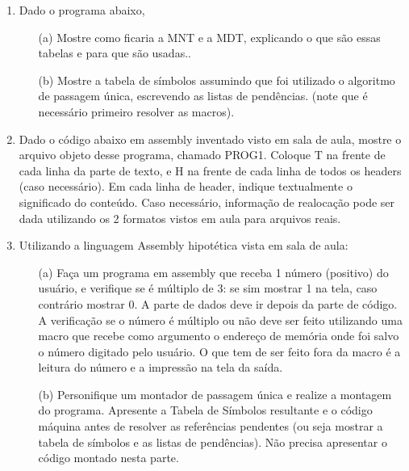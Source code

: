 \begin{enumerate}[resume]

    \item
    Dado o programa abaixo,    

    \begin{itemize}
        \item [(a)]
        Mostre como ficaria a MNT e a MDT, 
        explicando o que são essas tabelas e para que são usadas..

        \item [(b)]
        Mostre a tabela de símbolos assumindo que foi utilizado
        o algoritmo de passagem única, escrevendo as listas de pendências.
        (note que é necessário primeiro resolver as macros).
    \end{itemize}    

    \item
    Dado o código abaixo em assembly inventado visto em sala de aula,
    mostre o arquivo objeto desse programa, chamado PROG1.
    Coloque T na frente de cada linha da parte de texto,
    e H na frente de cada linha de todos os headers (caso necessário).
    Em cada linha de header, indique textualmente o significado do conteúdo.
    Caso necessário, informação de realocação pode ser dada 
    utilizando os 2 formatos vistos em aula para arquivos reais.
    
    \item
    Utilizando a linguagem Assembly hipotética vista em sala de aula:
    \begin{itemize}
        \item [(a)]
        Faça um programa em assembly que receba 1 número (positivo) do usuário, 
        e verifique se é múltiplo de 3:
        se sim mostrar 1 na tela, caso contrário mostrar 0. 
        A parte de dados deve ir depois da parte de código.
        A verificação se o número é múltiplo ou não 
        deve ser feito utilizando uma macro que recebe como argumento 
        o endereço de memória onde foi salvo o número digitado pelo usuário. 
        O que tem de ser feito fora da macro 
        é a leitura do número e a impressão na tela da saída.

        \item [(b)]
        Personifique um montador de passagem única e realize a montagem do programa.
        Apresente a Tabela de Símbolos resultante 
        e o código máquina antes de resolver as referências pendentes
        (ou seja mostrar a tabela de símbolos e as listas de pendências).
        Não precisa apresentar o código montado nesta parte.
    \end{itemize}


\end{enumerate}
